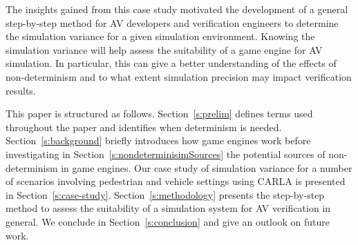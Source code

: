 \documentclass[runningheads,twocolumn,a4paper,10pt]{llncs}
\begin{document}
The insights gained from this case study motivated the development of a general step-by-step method for AV developers and verification engineers to determine the simulation variance for a given simulation environment. 
%
%
Knowing the simulation variance will help assess the suitability of a game engine for AV simulation.
In particular, this can give a better understanding of the effects of non-determinism and to what extent simulation precision may impact verification results.
%
%
%
%

This paper is structured as follows.
%
Section~\ref{s:prelim} defines terms used throughout the paper and identifies when determinism is needed. 
Section~\ref{s:background} briefly introduces how game engines work before investigating in Section~\ref{s:nondeterminisimSources} the potential sources of non-determinism in game engines.
%
Our case study of simulation variance for a number of scenarios involving pedestrian and vehicle settings using CARLA is presented in Section~\ref{s:case-study}.
%
Section~\ref{s:methodology} presents the step-by-step method to assess the suitability of a simulation system for AV verification in general. 
%
We conclude in Section~\ref{s:conclusion} and give an outlook on future work.
\end{document}
